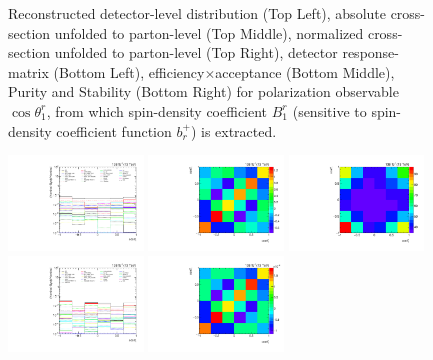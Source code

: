 \begin{refsection}
\begin{figure}[htb]
\begin{center}
\caption{Reconstructed detector-level distribution (Top Left), absolute cross-section unfolded to parton-level (Top Middle), normalized cross-section unfolded to parton-level (Top Right), detector response-matrix (Bottom Left), efficiency$\times$acceptance (Bottom Middle), Purity and Stability (Bottom Right) for polarization observable $\cos\theta_{1}^{r}$, from which spin-density coefficient $B_{1}^{r}$ (sensitive to spin-density coefficient function $b_r^{+}$) is extracted.}
\label{fig:b1r}
\end{center}
\end{figure}
\clearpage
\begin{figure}[htb]
\begin{center}
 \includegraphics[width=0.32\textwidth]{fig_fullRun2UL/unfolding/combined/deltaSystCombinedlog_rebinnedB_b1r.pdf}
 \includegraphics[width=0.32\textwidth]{fig_fullRun2UL/unfolding/combined/StatCovMatrix_rebinnedB_b1r.pdf}
 \includegraphics[width=0.32\textwidth]{fig_fullRun2UL/unfolding/combined/TotalSystCovMatrix_rebinnedB_b1r.pdf} \\
 \includegraphics[width=0.32\textwidth]{fig_fullRun2UL/unfolding/combined/deltaSystCombinedlogNorm_rebinnedB_b1r.pdf}
 \includegraphics[width=0.32\textwidth]{fig_fullRun2UL/unfolding/combined/StatCovMatrixNorm_rebinnedB_b1r.pdf}

\end{center}
\end{figure}
\end{refsection}
